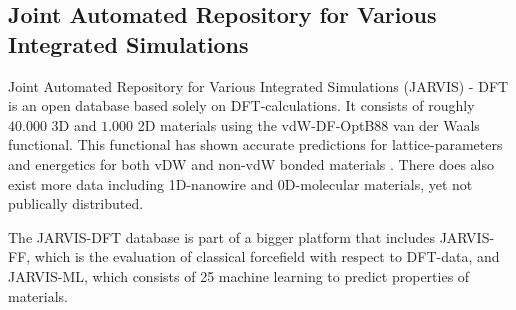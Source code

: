 \subsection{Joint Automated Repository for Various Integrated Simulations}

Joint Automated Repository for Various Integrated Simulations (JARVIS) - DFT is an open database based solely on DFT-calculations. It consists of roughly $40.000$ 3D and $1.000$ 2D materials using the vdW-DF-OptB88 van der Waals functional. This functional has shown accurate predictions for lattice-parameters and energetics for both vDW and non-vdW bonded materials  \cite{Choudhary2018}. There does also exist more data including 1D-nanowire and 0D-molecular materials, yet not publically distributed.

The JARVIS-DFT database is part of a bigger platform that includes JARVIS-FF, which is the evaluation of classical forcefield with respect to DFT-data, and JARVIS-ML, which consists of 25 machine learning to predict properties of materials.

\section{}

